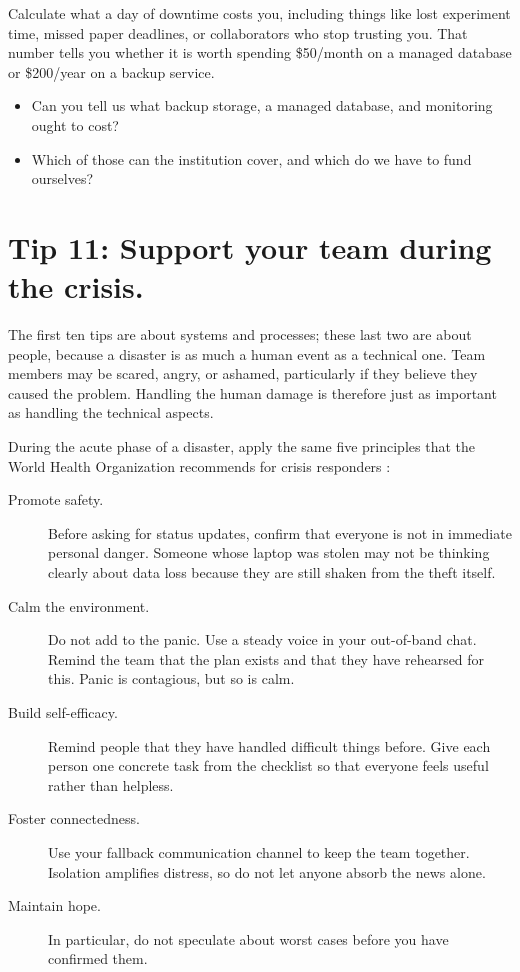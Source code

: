 \documentclass[10pt,letterpaper]{article}
\begin{document}
Calculate what a day of downtime costs you, including things like lost
experiment time, missed paper deadlines, or collaborators who stop trusting
you. That number tells you whether it is worth spending \$50/month on a managed
database or \$200/year on a backup service.

\begin{notebox}
  \begin{itemize}
  \item Can you tell us what backup storage, a managed database, and monitoring
    ought to cost?
  \item Which of those can the institution cover, and which do we have to fund
    ourselves?
  \end{itemize}
\end{notebox}

\section*{Tip 11: Support your team during the crisis.}

The first ten tips are about systems and processes; these last two are about
people, because a disaster is as much a human event as a technical one.  Team
members may be scared, angry, or ashamed, particularly if they believe they
caused the problem.  Handling the human damage is therefore just as important as
handling the technical aspects.

During the acute phase of a disaster, apply the same five principles that the
World Health Organization recommends for crisis responders \cite{who2026}:

\begin{description}
  
\item[Promote safety.]
  Before asking for status updates, confirm that everyone is not in immediate
  personal danger.  Someone whose laptop was stolen may not be thinking clearly
  about data loss because they are still shaken from the theft itself.
  
\item[Calm the environment.]
  Do not add to the panic.  Use a steady voice in your out-of-band chat.  Remind
  the team that the plan exists and that they have rehearsed for this.  Panic is
  contagious, but so is calm.
  
\item[Build self-efficacy.]
  Remind people that they have handled difficult things before.  Give each person
  one concrete task from the checklist so that everyone feels useful rather than
  helpless.
  
\item[Foster connectedness.]
  Use your fallback communication channel to keep the team together.  Isolation
  amplifies distress, so do not let anyone absorb the news alone.
  
\item[Maintain hope.]
  In particular, do not speculate about worst cases before you have confirmed
  them.
  
\end{description}
\end{document}
